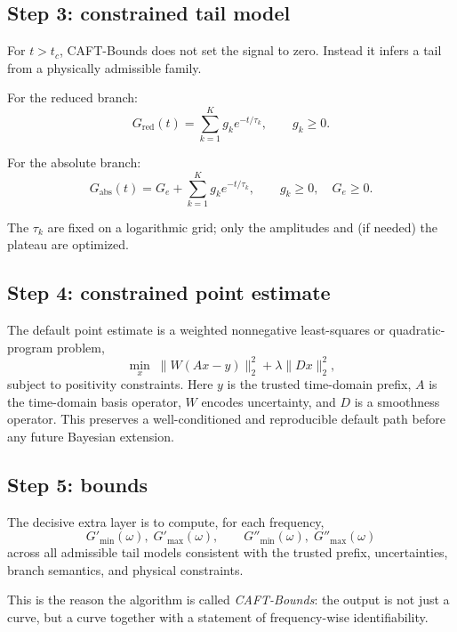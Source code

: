 \documentclass[11pt]{article}
\begin{document}
\subsection{Step 3: constrained tail model}
For $t>t_c$, CAFT-Bounds does not set the signal to zero. Instead it infers a tail from a physically admissible family.

For the reduced branch:
\begin{equation}
G_{\mathrm{red}}(t)=\sum_{k=1}^{K} g_k e^{-t/\tau_k}, \qquad g_k\ge 0.
\end{equation}

For the absolute branch:
\begin{equation}
G_{\mathrm{abs}}(t)=G_e+\sum_{k=1}^{K} g_k e^{-t/\tau_k}, \qquad g_k\ge 0,\quad G_e\ge 0.
\end{equation}

The $\tau_k$ are fixed on a logarithmic grid; only the amplitudes and (if needed) the plateau are optimized.

\subsection{Step 4: constrained point estimate}
The default point estimate is a weighted nonnegative least-squares or quadratic-program problem,
\begin{equation}
\min_x \; \|W(Ax-y)\|_2^2 + \lambda \|Dx\|_2^2,
\end{equation}
subject to positivity constraints. Here $y$ is the trusted time-domain prefix, $A$ is the time-domain basis operator, $W$ encodes uncertainty, and $D$ is a smoothness operator. This preserves a well-conditioned and reproducible default path before any future Bayesian extension.

\subsection{Step 5: bounds}
The decisive extra layer is to compute, for each frequency,
\begin{equation}
G'_{\min}(\omega),\;G'_{\max}(\omega),\qquad
G''_{\min}(\omega),\;G''_{\max}(\omega)
\end{equation}
across all admissible tail models consistent with the trusted prefix, uncertainties, branch semantics, and physical constraints.

This is the reason the algorithm is called \emph{CAFT-Bounds}: the output is not just a curve, but a curve together with a statement of frequency-wise identifiability.
\end{document}
